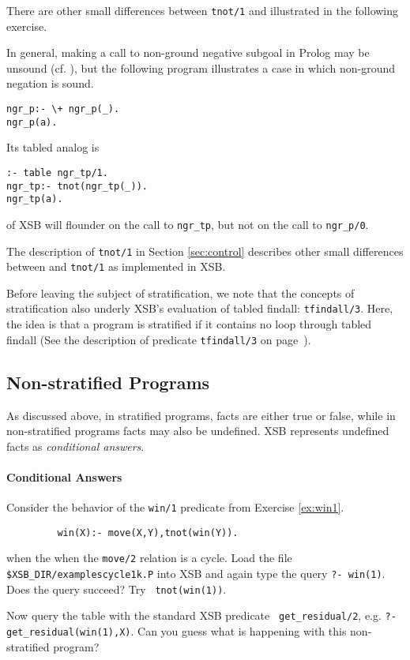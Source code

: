 There are other small differences between {\tt tnot/1} and \not
illustrated in the following exercise.

\begin{exercise}
In general, making a call to non-ground negative subgoal in Prolog may
be unsound (cf. \cite{Lloy84}), but the following program illustrates
a case in which non-ground negation is sound.
\begin{verbatim}
ngr_p:- \+ ngr_p(_).
ngr_p(a).
\end{verbatim}
Its tabled analog is 
\begin{verbatim}
:- table ngr_tp/1.
ngr_tp:- tnot(ngr_tp(_)).
ngr_tp(a).
\end{verbatim}
\version{} of XSB will flounder on the call to {\tt ngr\_tp}, but not
on the call to {\tt ngr\_p/0}.  

The description of {\tt tnot/1} in Section \ref{sec:control} describes
other small differences between \not and {\tt tnot/1} as implemented
in XSB.
\end{exercise}

Before leaving the subject of stratification, we note that the
concepts of stratification also underly XSB's evaluation of tabled
findall: {\tt tfindall/3}.  Here, the idea is that a program is
stratified if it contains no loop through tabled findall (See the
description of predicate {\tt tfindall/3} on
page~\pageref{tfindall/3}).

\subsection{Non-stratified Programs}

As discussed above, in stratified programs, facts are either true or
false, while in non-stratified programs facts may also be undefined.
XSB represents undefined facts as {\em conditional answers}.

\paragraph*{Conditional Answers}

\begin{exercise}
Consider the behavior of the {\tt win/1} predicate from Exercise
\ref{ex:win1}.
\begin{verbatim}
         win(X):- move(X,Y),tnot(win(Y)).
\end{verbatim}
when the when the {\tt move/2} relation is a cycle.  Load the file
{\tt \verb|$XSB_DIR/examples|cycle1k.P} into XSB and again type the
query {\tt ?- win(1)}.  Does the query succeed?  Try {\tt
tnot(win(1))}.

Now query the table with the standard XSB predicate {\tt
get\_residual/2}, e.g. {\tt ?- get\_residual(win(1),X)}.  Can you guess
what is happening with this non-stratified program?
\end{exercise}


